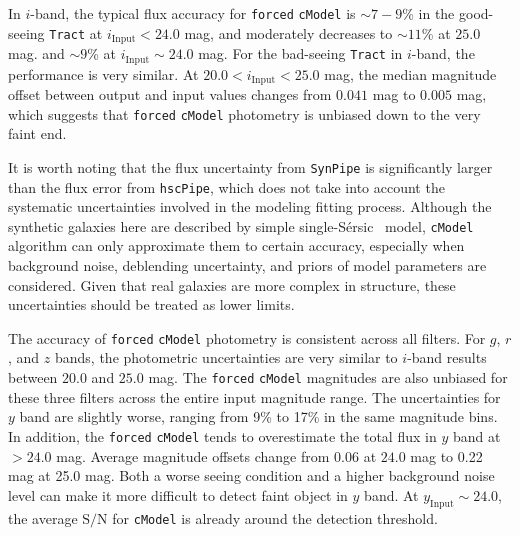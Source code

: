 \documentclass[useamsfonts]{pasj01}
\def\ser{{S\'{e}rsic\ }}
\def\hscpipe{\texttt{hscPipe}}
\def\synpipe{\texttt{SynPipe}}
\def\cmodel{\texttt{cModel}}
\def\forced{\texttt{forced}}
\def\tract{\texttt{Tract}}
\def\s2n{{$\mathrm{S}/\mathrm{N}$}}
\newcommand{\plus}{\raisebox{.4\height}{\scalebox{.6}{+}}}
\newcommand{\minus}{\raisebox{.4\height}{\scalebox{.8}{-}}}
\begin{document}
    In $i$-band, the typical flux accuracy for \forced{} \cmodel{} is ${\sim}7-9$\%
    in the good-seeing \tract{} at $i_{\mathrm{Input}}<24.0$ mag, and moderately 
    decreases to ${\sim}11$\% at $25.0$ mag.
    and ${\sim}9$\% at $i_{\mathrm{Input}}{\sim}24.0$ mag.
    For the bad-seeing \tract{} in $i$-band, the performance is very similar.
    At $20.0 < i_{\mathrm{Input}} < 25.0$ mag, the median magnitude offset
    between output and input values changes from \plus{}$0.041$ mag to
    \minus{}$0.005$ mag, which suggests that \forced{} \cmodel{} photometry is
    unbiased down to the very faint end.
    
    It is worth noting that the flux uncertainty from \synpipe{} is significantly 
    larger than the flux error from \hscpipe{}, which does not take into account the 
    systematic uncertainties involved in the modeling fitting process.
    Although the synthetic galaxies here are described by simple single-\ser{} model, 
    \cmodel{} algorithm can only approximate them to certain accuracy, especially when 
    background noise, deblending uncertainty, and priors of model parameters are 
    considered.
    Given that real galaxies are more complex in structure, these uncertainties should 
    be treated as lower limits.


    The accuracy of \forced{} \cmodel{} photometry is consistent across all filters.
    For $g$, $r$, and $z$ bands, the photometric uncertainties are very similar to
    $i$-band results between $20.0$ and $25.0$ mag.
    The \forced{} \cmodel{} magnitudes are also unbiased for these three filters
    across the entire input magnitude range.
    The uncertainties for $y$ band are slightly worse, ranging from 9\% to 17\% in the
    same magnitude bins.
    In addition, the \forced{} \cmodel{} tends to overestimate the total flux in 
    $y$ band at $>24.0$ mag.
    Average magnitude offsets change from \minus{}0.06 at $24.0$ mag to \minus{}0.22
    mag at 25.0 mag.
    Both a worse seeing condition and a higher background noise level can make it more
    difficult to detect faint object in $y$ band.
    At $y_{\mathrm{Input}}{\sim}24.0$, the average \s2n{} for \cmodel{} is already
    around the detection threshold.
\end{document}
